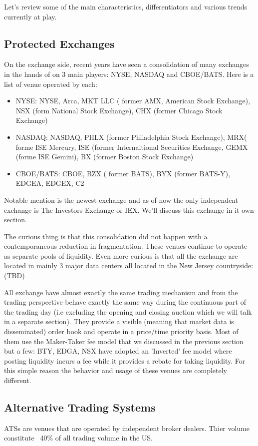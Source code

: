 Let's review some of the main characteristics, differentiators and various trends currently at play.

\subsection{Protected Exchanges}
On the exchange side, recent years have seen a consolidation of many exchanges in the hands of on 3 main players: NYSE, NASDAQ and CBOE/BATS. Here is a list of venue operated by each:
\begin{itemize}
\item NYSE: NYSE, Arca, MKT LLC ( former AMX, American Stock Exchange), NSX (form National Stock Exchange), CHX (former Chicago Stock Exchange)
\item NASDAQ:  NASDAQ, PHLX (former Philadelphia Stock Exchange), MRX( forme ISE Mercury, ISE (former Internaltional Securities Exchange, GEMX (forme ISE Gemini), BX (former Boston Stock Exchange)
\item CBOE/BATS: CBOE, BZX ( former BATS), BYX (former BATS-Y), EDGEA, EDGEX, C2
\end{itemize}

Notable mention is the newest exchange and as of now the only independent exchange is The Investors Exchange or IEX. We'll discuss this exchange in it own section.

The curious thing is that this consolidation did not happen with a contemporaneous reduction in fragmentation. These venues continue to operate as separate pools of liquidity. Even more curious is that all the exchange are located in mainly 3 major data centers all located in the New Jersey countryside: (TBD)

All exchange have almost exactly the same trading mechanism and from the trading perspective behave exactly the same way during the continuous part of the trading day (i.e excluding the opening and closing auction which we will talk in a separate section). They provide a visible (meaning that market data is disseminated) order book and operate in a price/time priority basis. Most of them use the Maker-Taker fee model that we discussed in the previous section but a few: BTY, EDGA, NSX  have adopted an 'Inverted' fee model where posting liquidity incurs a fee while it provides a rebate for taking liquidity. For this simple reason the behavior and usage of these venues are completely different.

\subsection{Alternative Trading Systems}
ATSs are venues that are operated by independent broker dealers. Thier volume constitute ~40\% of all trading volume in the US.

